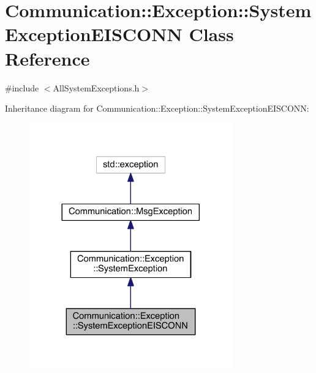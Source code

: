 \hypertarget{class_communication_1_1_exception_1_1_system_exception_e_i_s_c_o_n_n}{}\section{Communication\+:\+:Exception\+:\+:System\+Exception\+E\+I\+S\+C\+O\+N\+N Class Reference}
\label{class_communication_1_1_exception_1_1_system_exception_e_i_s_c_o_n_n}


{\ttfamily \#include $<$All\+System\+Exceptions.\+h$>$}



Inheritance diagram for Communication\+:\+:Exception\+:\+:System\+Exception\+E\+I\+S\+C\+O\+N\+N\+:\nopagebreak
\begin{figure}[H]
\begin{center}
\leavevmode
\includegraphics[width=248pt]{class_communication_1_1_exception_1_1_system_exception_e_i_s_c_o_n_n__inherit__graph}
\end{center}
\end{figure}


